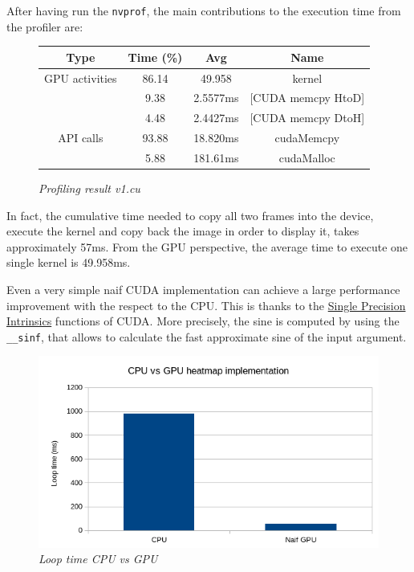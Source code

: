 \documentclass[paper=a4, fontsize=10pt]{scrartcl}	%
\begin{document}
	After having run the \texttt{nvprof}, the main contributions to the execution time from the profiler are:
	\begin{figure}[H]
		\centering
			\begin{center}
			\begin{tabular}{ |c|c|c|c| } 
				\hline
				\textbf{Type} & \textbf{Time} (\%) & \textbf{Avg} & \textbf{Name} \\ 
				\hline
				GPU activities & 86.14 & 49.958 & kernel \\ 
				& 9.38 & 2.5577ms & [CUDA memcpy HtoD] \\ 
				& 4.48 & 2.4427ms & [CUDA memcpy DtoH] \\ 
				\hline
				API calls & 93.88 & 18.820ms & cudaMemcpy \\ 
				& 5.88 & 181.61ms & cudaMalloc \\ 
				\hline
			\end{tabular}
		\end{center}
		\label{fig:table_v1}
		\caption{\textit{Profiling result v1.cu}}
	\end{figure}
	In fact, the cumulative time needed to copy all two frames into the device, execute the kernel and copy back the image in order to display it, takes approximately 57ms. From the GPU perspective, the average time to execute one single kernel is 49.958ms.
	
		
	Even a very simple naif CUDA implementation can achieve a large performance improvement with the respect to the CPU. This is thanks to the \href{https://docs.nvidia.com/cuda/cuda-math-api/group__CUDA__MATH__INTRINSIC__SINGLE.html}{Single Precision Intrinsics} functions of CUDA. More precisely, the sine is computed by using the \texttt{\_\_sinf}, that allows to calculate the fast approximate sine of the input argument.
	
	\begin{figure}[H]
		\centering
		\begin{center}
			\includegraphics[width=0.35\linewidth]{images/heatmap/gpu_naif}
		\end{center}
	\label{fig:cpu_vs_gpu}
	\caption{\textit{Loop time CPU vs GPU}}
	\end{figure}
	
\end{document}

